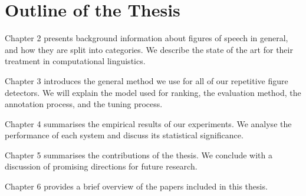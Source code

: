 \section{Outline of the Thesis}


\noindent  Chapter 2 presents background information about figures of speech in general, and how they are split into categories. We describe the state of the art for their treatment in computational linguistics.
\bigskip

\noindent  Chapter  3 introduces the general method we use for all of our repetitive figure detectors. We will explain the model used for ranking, the evaluation method, the annotation process, and the tuning process. 
\bigskip

\noindent  Chapter 4 summarises the empirical results of our experiments. We analyse the performance of each system and discuss its statistical significance.
\bigskip


\noindent Chapter 5 summarises the contributions of the thesis. We conclude with a discussion of promising directions for future research.
\bigskip

\noindent  Chapter 6 provides a brief overview of the papers included in this thesis.


%